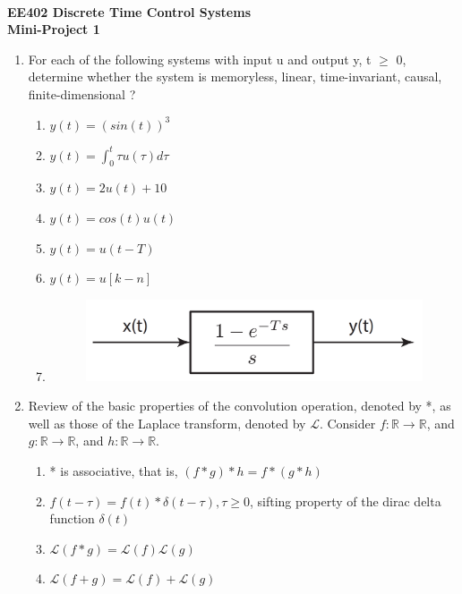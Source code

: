 \begin{minipage}{1.0\textwidth}
\center
\- \\[0.5cm]
\textbf{\large EE402 Discrete Time Control Systems \\[0.2cm] Mini-Project 1} \\
\end{minipage}


\begin{enumerate}
	\item For each of the following systems with input u and output y, t $\geq$ 0, determine whether the system is memoryless, linear, time-invariant, causal, finite-dimensional ? 

		\begin{enumerate}
			\item 	$ y(t) = (sin(t))^3	$
			\item 	$ y(t) = \int_{0}^{t} \tau u(\tau) d\tau $ 	
			\item 	$ y(t) = 2u(t)+10$
			\item 	$ y(t) = cos(t)u(t)	$
			\item 	$ y(t) = u(t-T)	$
			\item 	$ y(t) = u[k-n]	$
			\item \-	
				\begin{figure}[H]
					\center
					\setlength{\unitlength}{\textwidth} 
					\includegraphics[width=0.6\unitlength]{1g}
				\end{figure}
		\end{enumerate}
	
	
	\item Review of the basic properties of the convolution operation, denoted by *, as well as those of the Laplace transform, denoted by $\mathcal{L}$. Consider   $ f : \mathbb{R} \rightarrow \mathbb{R}$, and  $ g : \mathbb{R} \rightarrow \mathbb{R}$, and  $ h : \mathbb{R} \rightarrow \mathbb{R}$.
		
		\begin{enumerate}
			\item * is associative, that is, $(f * g) * h = f * (g * h)$
			\item $f(t - \tau ) = f(t) * \delta (t - \tau ),\tau \geq 0$, sifting property of the dirac delta function $ \delta (t)$
			\item $ \mathcal{L}(f * g) = \mathcal{L}(f)\mathcal{L}(g) $
			\item $ \mathcal{L}(f + g) = \mathcal{L}(f) + \mathcal{L}(g) $
		\end{enumerate}
	

\end{enumerate}
